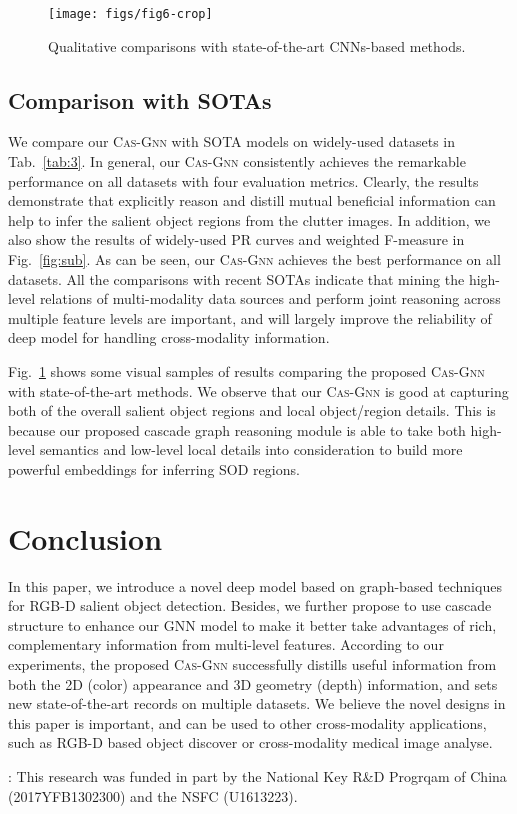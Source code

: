 \documentclass[runningheads]{llncs}
\begin{document}
\begin{figure}[pt]
	\begin{center}
		\texttt{[image: figs/fig6-crop]}
	\end{center}
	\caption{Qualitative comparisons with state-of-the-art CNNs-based methods.}
	\label{fig:6}
\end{figure}

\subsection{Comparison with SOTAs}

 We compare our {\scshape{Cas-Gnn}} with  SOTA models on  widely-used datasets in Tab.~\ref{tab:3}. In general, our {\scshape{Cas-Gnn}} consistently achieves the remarkable performance on all datasets with four evaluation metrics. Clearly, the results demonstrate that explicitly reason and distill mutual beneficial information can help to infer the salient object regions from the clutter images. In addition, we also show the results of widely-used PR curves and weighted F-measure in Fig.~\ref{fig:sub}. As can be seen, our {\scshape{Cas-Gnn}} achieves the best performance on all datasets. All the comparisons with recent SOTAs indicate that mining the high-level relations of multi-modality data sources and perform joint reasoning across multiple feature levels are important, and will largely improve the reliability of deep model for handling cross-modality information. 

 Fig.~\ref{fig:6} shows some visual samples of results comparing the proposed {\scshape{Cas-Gnn}}  with state-of-the-art methods. We observe that our {\scshape{Cas-Gnn}} is good at capturing both of the overall salient object regions and local object/region details. This is because our proposed cascade graph reasoning module is able to take both high-level semantics and low-level local details into consideration to build more powerful embeddings for inferring SOD regions.

\section{Conclusion} 
In this paper, we introduce a novel deep model based on graph-based techniques for RGB-D salient object detection. Besides, we further propose to use cascade structure to enhance our GNN model to make it better take advantages of rich, complementary information from multi-level features. According to our experiments, the proposed {\scshape{Cas-Gnn}} successfully distills useful information from both the 2D (color) appearance and 3D geometry (depth) information, and sets new state-of-the-art records on multiple datasets. We believe the novel designs in this paper is important, and can be used to other cross-modality applications, such as RGB-D based object discover or cross-modality medical image analyse. 

: This research was funded in part by	the National Key R\&D Progrqam of China (2017YFB1302300) and the NSFC (U1613223). 


\clearpage


\end{document}
